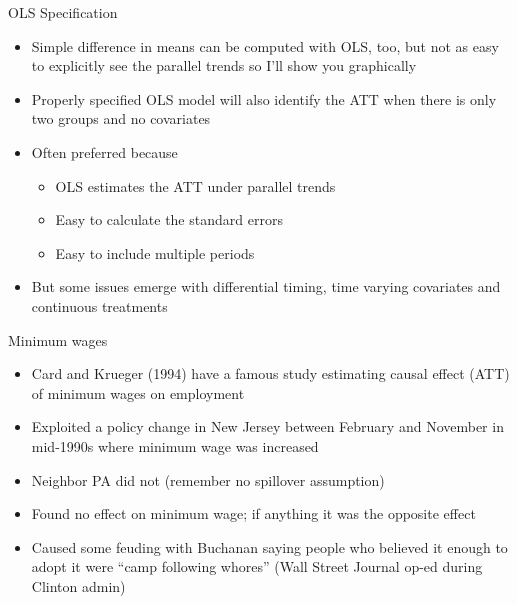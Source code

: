 \documentclass{beamer}
\begin{document}
\begin{frame}{OLS Specification}
	
	\begin{itemize}
	\item Simple difference in means can be computed with OLS, too, but not as easy to explicitly see the parallel trends so I'll show you graphically
	\item Properly specified OLS model will also identify the ATT when there is only two groups and no covariates
	\item Often preferred because
		\begin{itemize}
		\item OLS estimates the ATT under parallel trends
		\item Easy to calculate the standard errors
		\item Easy to include multiple periods
		\end{itemize}
	\item But some issues emerge with differential timing, time varying covariates and continuous treatments
	\end{itemize}
\end{frame}

\begin{frame}{Minimum wages}

\begin{itemize}
\item Card and Krueger (1994) have a famous study estimating causal effect (ATT) of minimum wages on employment
\item Exploited a policy change in New Jersey between February and November in mid-1990s where minimum wage was increased
\item Neighbor PA did not (remember no spillover assumption)
\item Found no effect on minimum wage; if anything it was the opposite effect
\item Caused some feuding with Buchanan saying people who believed it enough to adopt it were ``camp following whores'' (Wall Street Journal op-ed during Clinton admin)
\end{itemize}

\end{frame}
\end{document}
